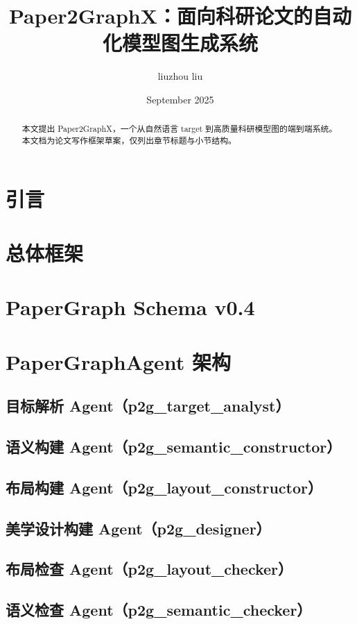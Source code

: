 \documentclass[11pt]{article}
\title{Paper2GraphX：面向科研论文的自动化模型图生成系统}
\author{liuzhou liu}
\date{September 2025}
\begin{document}
\maketitle

\begin{abstract}
本文提出 Paper2GraphX，一个从自然语言 target 到高质量科研模型图的端到端系统。本文档为论文写作框架草案，仅列出章节标题与小节结构。
\end{abstract}

\section{引言}

\section{总体框架}

\section{PaperGraph Schema v0.4}

\section{PaperGraphAgent 架构}
\subsection{目标解析 Agent（p2g\_target\_analyst）}
\subsection{语义构建 Agent（p2g\_semantic\_constructor）}
\subsection{布局构建 Agent（p2g\_layout\_constructor）}
\subsection{美学设计构建 Agent（p2g\_designer）}
\subsection{布局检查 Agent（p2g\_layout\_checker）}
\subsection{语义检查 Agent（p2g\_semantic\_checker）}
\end{document}
